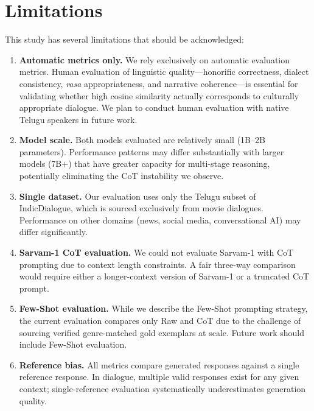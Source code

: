 \documentclass[11pt]{article}
\begin{document}
\section*{Limitations}

This study has several limitations that should be acknowledged:

\begin{enumerate}[leftmargin=*,itemsep=2pt]
    \item \textbf{Automatic metrics only.} We rely exclusively on automatic evaluation metrics. Human evaluation of linguistic quality---honorific correctness, dialect consistency, \textit{rasa} appropriateness, and narrative coherence---is essential for validating whether high cosine similarity actually corresponds to culturally appropriate dialogue. We plan to conduct human evaluation with native Telugu speakers in future work.
    
    \item \textbf{Model scale.} Both models evaluated are relatively small (1B--2B parameters). Performance patterns may differ substantially with larger models (7B+) that have greater capacity for multi-stage reasoning, potentially eliminating the CoT instability we observe.
    
    \item \textbf{Single dataset.} Our evaluation uses only the Telugu subset of IndicDialogue, which is sourced exclusively from movie dialogues. Performance on other domains (news, social media, conversational AI) may differ significantly.
    
    \item \textbf{Sarvam-1 CoT evaluation.} We could not evaluate Sarvam-1 with CoT prompting due to context length constraints. A fair three-way comparison would require either a longer-context version of Sarvam-1 or a truncated CoT prompt.
    
    \item \textbf{Few-Shot evaluation.} While we describe the Few-Shot prompting strategy, the current evaluation compares only Raw and CoT due to the challenge of sourcing verified genre-matched gold exemplars at scale. Future work should include Few-Shot evaluation.
    
    \item \textbf{Reference bias.} All metrics compare generated responses against a single reference response. In dialogue, multiple valid responses exist for any given context; single-reference evaluation systematically underestimates generation quality.
\end{enumerate}
\end{document}
